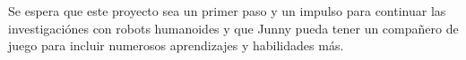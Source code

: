 Se espera que este proyecto sea un primer paso y un impulso para continuar las investigaci\'ones con robots humanoides y que Junny pueda tener un compa\~nero de juego para incluir numerosos aprendizajes y habilidades m\'as.

